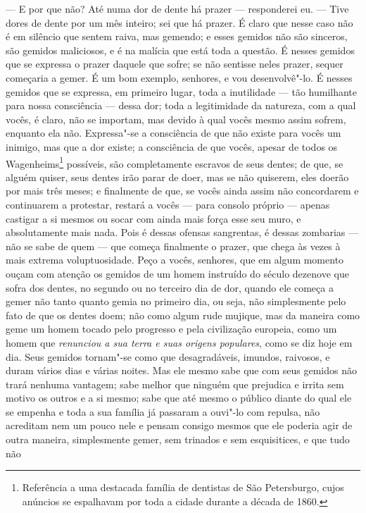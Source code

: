 --- E por que não? Até numa dor de dente há prazer --- responderei eu. ---
Tive dores de dente por um mês inteiro; sei que há prazer. É claro que
nesse caso não é em silêncio que sentem raiva, mas gemendo; e esses
gemidos não são sinceros, são gemidos maliciosos, e é na malícia que
está toda a questão. É nesses gemidos que se expressa o prazer daquele
que sofre; se não sentisse neles prazer, sequer começaria a gemer. É um
bom exemplo, senhores, e vou desenvolvê"-lo. É nesses gemidos que se
expressa, em primeiro lugar, toda a inutilidade --- tão humilhante para
nossa consciência --- dessa dor; toda a legitimidade da natureza, com a
qual vocês, é claro, não se importam, mas devido à qual vocês mesmo
assim sofrem, enquanto ela não. Expressa"-se a consciência de que não
existe para vocês um inimigo, mas que a dor existe; a consciência de
que vocês, apesar de todos os Wagenheims\footnote{ Referência a uma destacada 
família de dentistas de São Petersburgo,
cujos anúncios se espalhavam por toda a cidade durante a década de
1860.} possíveis, são completamente escravos de seus dentes; de que, se alguém
quiser, seus dentes irão parar de doer, mas se não quiserem, eles
doerão por mais três meses; e finalmente de que, se vocês ainda assim
não concordarem e continuarem a protestar, restará a vocês --- para
consolo próprio --- apenas castigar a si mesmos ou socar com ainda mais
força esse seu muro, e absolutamente mais nada. Pois é dessas ofensas
sangrentas, é dessas zombarias --- não se sabe de quem --- que começa
finalmente o prazer, que chega às vezes à mais extrema voluptuosidade.
Peço a vocês, senhores, que em algum momento ouçam com atenção os
gemidos de um homem instruído do século  dezenove que sofra dos dentes, no
segundo ou no terceiro dia de dor, quando ele começa a gemer não tanto
quanto gemia no primeiro dia, ou seja, não simplesmente pelo fato de
que os dentes doem; não como algum rude mujique, mas da maneira como
geme um homem tocado pelo progresso e pela civilização europeia, como
um homem que \textit{renunciou a sua terra e suas origens populares}, como se
diz hoje em dia. Seus gemidos tornam"-se como que desagradáveis,
imundos, raivosos, e duram vários dias e várias noites. Mas ele mesmo
sabe que com seus gemidos não trará nenhuma vantagem; sabe melhor que
ninguém que prejudica e irrita sem motivo os outros e a si mesmo; sabe
que até mesmo o público diante do qual ele se empenha e toda a sua
família já passaram a ouvi"-lo com repulsa, não acreditam nem um pouco
nele e pensam consigo mesmos que ele poderia agir de outra maneira,
simplesmente gemer, sem trinados e sem esquisitices, e que tudo não
